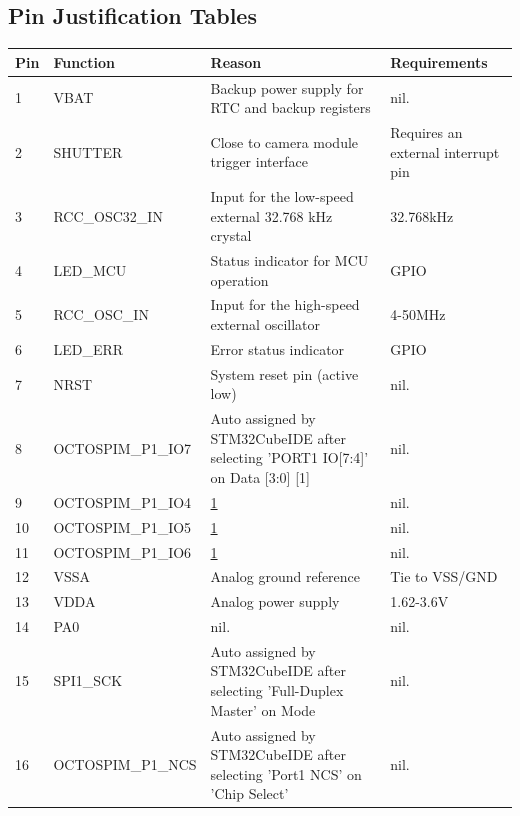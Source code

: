\subsection{Pin Justification Tables}


\begin{table}[H]
    \centering
    \begin{tabular}{|l|p{3cm}|p{6cm}|p{4.5cm}|}
        \hline
        \textbf{Pin} & \textbf{Function} & \textbf{Reason} & \textbf{Requirements} \\
        \hline
        1 & VBAT & Backup power supply for RTC and backup registers & nil. \\ \hline
        2 & SHUTTER & Close to camera module trigger interface & Requires an external interrupt pin \\ \hline
        3 & RCC\_OSC32\_IN & Input for the low-speed external 32.768 kHz crystal & 32.768kHz \\ \hline
        4 & LED\_MCU & Status indicator for MCU operation & GPIO \\ \hline
        5 & RCC\_OSC\_IN & Input for the high-speed external oscillator & 4-50MHz \\ \hline
        6 & LED\_ERR & Error status indicator & GPIO \\ \hline
        7 & NRST & System reset pin (active low) & nil. \\ \hline
        8 & OCTOSPIM\_P1\_IO7 & Auto assigned by STM32CubeIDE after selecting 'PORT1 IO[7:4]' on Data [3:0] \hypertarget{octo-io-8}{[1]} & nil. \\ \hline
        9 & OCTOSPIM\_P1\_IO4 & \hyperlink{octo-io-8}{1} & nil. \\ \hline
        10 & OCTOSPIM\_P1\_IO5 & \hyperlink{octo-io-8}{1} & nil. \\ \hline
        11 & OCTOSPIM\_P1\_IO6 & \hyperlink{octo-io-8}{1} & nil. \\ \hline
        12 & VSSA & Analog ground reference & Tie to VSS/GND \\ \hline
        13 & VDDA & Analog power supply & 1.62-3.6V \\ \hline
        14 & PA0 & nil. & nil. \\ \hline
        15 & SPI1\_SCK & Auto assigned by STM32CubeIDE after selecting 'Full-Duplex Master' on Mode & nil. \\ \hline
        16 & OCTOSPIM\_P1\_NCS & Auto assigned by STM32CubeIDE after selecting 'Port1 NCS' on 'Chip Select' & nil. \\ \hline

\end{tabular}
\end{table}
